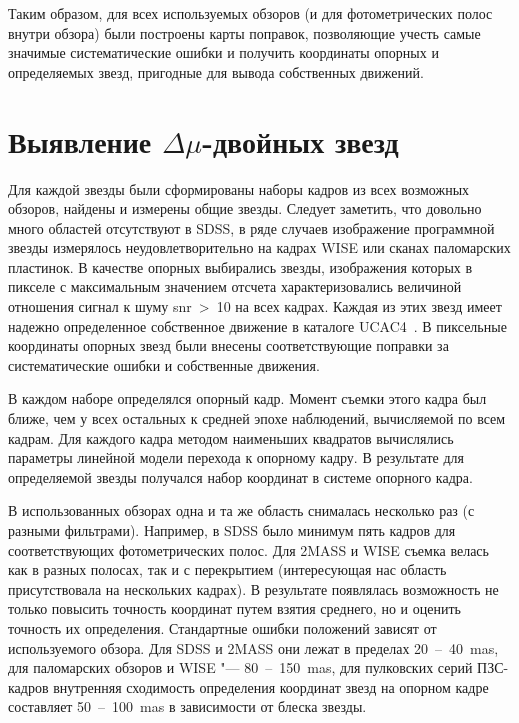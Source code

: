 Таким образом, для всех используемых обзоров (и для фотометрических полос внутри обзора) были построены карты поправок, позволяющие учесть самые значимые систематические ошибки и получить координаты опорных и определяемых звезд, пригодные для вывода собственных движений.
\section{Выявление $\Delta\mu$-двойных звезд} \label{sec:ch3/sect3}
Для каждой звезды были сформированы наборы кадров из всех возможных обзоров, найдены и измерены общие звезды. Следует заметить, что довольно много областей отсутствуют в SDSS, в ряде случаев изображение программной звезды измерялось неудовлетворительно на кадрах WISE или сканах паломарских пластинок. В качестве опорных выбирались звезды, изображения которых в пикселе с максимальным значением отсчета характеризовались величиной отношения сигнал к шуму snr~>~10 на всех кадрах. Каждая из этих звезд имеет надежно определенное собственное движение в каталоге UCAC4~\cite{2013AJ....145...44Z}. В пиксельные координаты опорных звезд были внесены соответствующие поправки за систематические ошибки и собственные движения.

В каждом наборе определялся опорный кадр. Момент съемки этого кадра был ближе, чем у всех остальных к средней эпохе наблюдений, вычисляемой по всем кадрам. Для каждого кадра методом наименьших квадратов вычислялись параметры линейной модели перехода к опорному кадру. В результате для определяемой звезды получался набор координат в системе опорного кадра.

В использованных обзорах одна и та же область снималась несколько раз (с разными фильтрами). Например, в SDSS было минимум пять кадров для соответствующих фотометрических полос. Для 2MASS и WISE съемка велась как в разных полосах, так и с перекрытием (интересующая нас область присутствовала на нескольких кадрах). В результате появлялась возможность не только повысить точность координат путем взятия среднего, но и оценить точность их определения. Стандартные ошибки положений зависят от используемого обзора. Для SDSS и 2MASS они лежат в пределах 20~--~40~mas, для паломарских обзоров и WISE "--- 80~--~150~mas, для пулковских серий ПЗС-кадров внутренняя сходимость определения координат звезд на опорном кадре составляет 50~--~100~mas в зависимости от блеска звезды.

